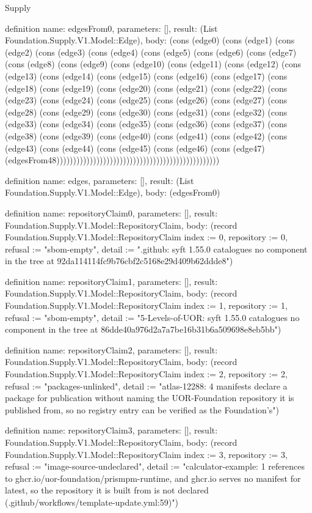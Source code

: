 \begin{lexlean}{Supply}
\begin{semanticmodule}
definition{
  name: edgesFrom0,
  parameters: [],
  result: (List Foundation.Supply.V1.Model::Edge),
  body: (cons (edge0) (cons (edge1) (cons (edge2) (cons (edge3) (cons (edge4) (cons (edge5) (cons (edge6) (cons (edge7) (cons (edge8) (cons (edge9) (cons (edge10) (cons (edge11) (cons (edge12) (cons (edge13) (cons (edge14) (cons (edge15) (cons (edge16) (cons (edge17) (cons (edge18) (cons (edge19) (cons (edge20) (cons (edge21) (cons (edge22) (cons (edge23) (cons (edge24) (cons (edge25) (cons (edge26) (cons (edge27) (cons (edge28) (cons (edge29) (cons (edge30) (cons (edge31) (cons (edge32) (cons (edge33) (cons (edge34) (cons (edge35) (cons (edge36) (cons (edge37) (cons (edge38) (cons (edge39) (cons (edge40) (cons (edge41) (cons (edge42) (cons (edge43) (cons (edge44) (cons (edge45) (cons (edge46) (cons (edge47) (edgesFrom48)))))))))))))))))))))))))))))))))))))))))))))))))
}

definition{
  name: edges,
  parameters: [],
  result: (List Foundation.Supply.V1.Model::Edge),
  body: (edgesFrom0)
}

definition{
  name: repositoryClaim0,
  parameters: [],
  result: Foundation.Supply.V1.Model::RepositoryClaim,
  body: (record Foundation.Supply.V1.Model::RepositoryClaim {index := 0, repository := 0, refusal := "sbom-empty", detail := ".github: syft 1.55.0 catalogues no component in the tree at 92da114114fc9b76cbf2c5168e29d409b62ddde8"})
}

definition{
  name: repositoryClaim1,
  parameters: [],
  result: Foundation.Supply.V1.Model::RepositoryClaim,
  body: (record Foundation.Supply.V1.Model::RepositoryClaim {index := 1, repository := 1, refusal := "sbom-empty", detail := "5-Levels-of-UOR: syft 1.55.0 catalogues no component in the tree at 86dde40a976d2a7a7be16b31b6a509698e8eb5bb"})
}

definition{
  name: repositoryClaim2,
  parameters: [],
  result: Foundation.Supply.V1.Model::RepositoryClaim,
  body: (record Foundation.Supply.V1.Model::RepositoryClaim {index := 2, repository := 2, refusal := "packages-unlinked", detail := "atlas-12288: 4 manifests declare a package for publication without naming the UOR-Foundation repository it is published from, so no registry entry can be verified as the Foundation's"})
}

definition{
  name: repositoryClaim3,
  parameters: [],
  result: Foundation.Supply.V1.Model::RepositoryClaim,
  body: (record Foundation.Supply.V1.Model::RepositoryClaim {index := 3, repository := 3, refusal := "image-source-undeclared", detail := "calculator-example: 1 references to ghcr.io/uor-foundation/prismpm-runtime, and ghcr.io serves no manifest for latest, so the repository it is built from is not declared (.github/workflows/template-update.yml:59)"})
}


\end{semanticmodule}
\end{lexlean}
